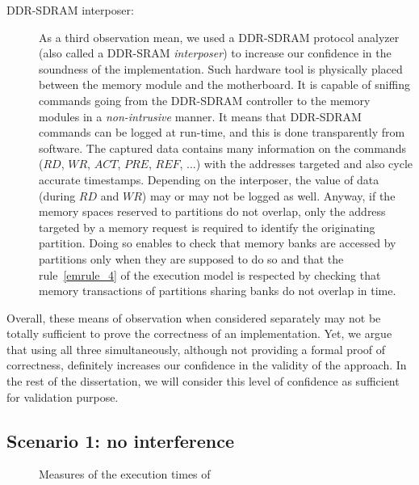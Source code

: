 \documentclass[main.tex]{subfiles}
\begin{document}
\begin{description}
    \item[DDR-SDRAM interposer: ] As a third observation mean, we used a
        DDR-SDRAM protocol analyzer (also called a DDR-SRAM \emph{interposer})
        to increase our confidence in the soundness of the implementation. Such
        hardware tool is physically placed between the memory module and the
        motherboard. It is capable of sniffing commands going from the
        DDR-SDRAM controller to the memory modules in a \emph{non-intrusive}
        manner. It means that DDR-SDRAM commands can be logged at run-time, and
        this is done transparently from software. The captured data contains
        many information on the commands ($RD$, $WR$, $ACT$, $PRE$, $REF$, ...)
        with the addresses targeted and also cycle accurate timestamps.
        Depending on the interposer, the value of data (during $RD$ and $WR$)
        may or may not be logged as well. Anyway, if the memory spaces reserved
        to partitions do not overlap, only the address targeted by a memory
        request is required to identify the originating partition. Doing so
        enables to check that memory banks are accessed by partitions only when
        they are supposed to do so and that the rule~\ref{emrule_4} of the
        execution model is respected by checking that memory transactions of
        partitions sharing banks do not overlap in time.
\end{description}

Overall, these means of observation when considered separately may not be
totally sufficient to prove the correctness of an implementation. Yet, we argue
that using all three simultaneously, although not providing a formal proof of
correctness, definitely increases our confidence in the validity of the
approach. In the rest of the dissertation, we will consider this level of
confidence as sufficient for validation purpose.

\subsection{Scenario 1: no interference}
\begin{figure}
    \centering
    \scalebox{1}{}	
    \vspace{-5mm}
    \caption{Measures of the execution times of \rosace}
	\label{fig_implemExecModel_ETrosace}
\end{figure}
\end{document}

